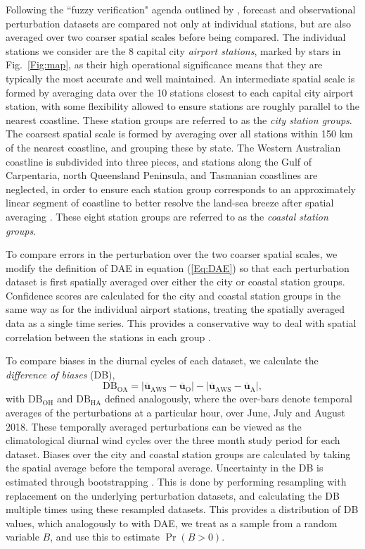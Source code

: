\documentclass[twocol]{ametsoc}
\DeclareMathOperator{\pr}{Pr}
\begin{document}
Following the ``fuzzy verification" agenda outlined by \citet{ebert08}, forecast and observational perturbation datasets are compared not only at individual stations, but are also averaged over two coarser spatial scales before being compared. The individual stations we consider are the 8 capital city \textit{airport stations}, marked by stars in Fig.~\ref{Fig:map}, as their high operational significance means that they are typically the most accurate and well maintained. An intermediate spatial scale is formed by averaging data over the 10 stations closest to each capital city airport station, with some flexibility allowed to ensure stations are roughly parallel to the nearest coastline. These station groups are referred to as the \textit{city station groups}. The coarsest spatial scale is formed by averaging over all stations within 150 km of the nearest coastline, and grouping these by state. The Western Australian coastline is subdivided into three pieces, and stations along the Gulf of Carpentaria, north Queensland Peninsula, and Tasmanian coastlines are neglected, in order to ensure each station group corresponds to an approximately linear segment of coastline to better resolve the land-sea breeze after spatial averaging \citep[e.g.][]{vincent16}. These eight station groups are referred to as the \textit{coastal station groups}. 

To compare errors in the perturbation over the two coarser spatial scales, we modify the definition of DAE in equation (\ref{Eq:DAE}) so that each perturbation dataset is first spatially averaged over either the city or coastal station groups. Confidence scores are calculated for the city and coastal station groups in the same way as for the individual airport stations, treating the spatially averaged data as a single time series. This provides a conservative way to deal with spatial correlation between the stations in each group \citep{griffiths17}. 

To compare biases in the diurnal cycles of each dataset, we calculate the \textit{difference of biases} (DB),
\begin{equation}
\text{DB}_{\text{OA}} = \left\lvert \overline{\boldsymbol{u}}_{\text{AWS}}-\overline{\boldsymbol{u}}_{\text{O}} \right\rvert - \left\lvert \overline{\boldsymbol{u}}_{\text{AWS}}-\overline{\boldsymbol{u}}_{\text{A}} \right\rvert,
\end{equation}
with $\text{DB}_{\text{OH}}$ and $\text{DB}_{\text{HA}}$ defined analogously, where the over-bars denote temporal averages of the perturbations at a particular hour, over June, July and August 2018. These temporally averaged perturbations can be viewed as the climatological diurnal wind cycles over the three month study period for each dataset. Biases over the city and coastal station groups are calculated by taking the spatial average before the temporal average. Uncertainty in the DB is estimated through bootstrapping \citep{efron79}. This is done by performing resampling with replacement on the underlying perturbation datasets, and calculating the DB multiple times using these resampled datasets. This provides a distribution of DB values, which analogously to with DAE, we treat as a sample from a random variable $B$, and use this to estimate $\pr\left(B > 0\right)$.
\end{document}
